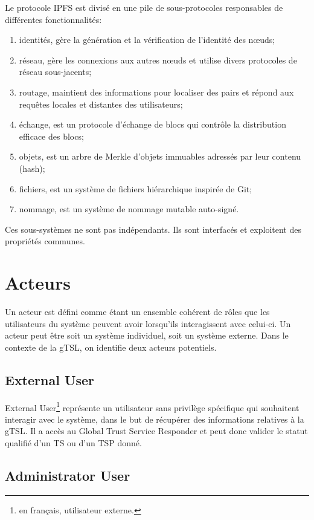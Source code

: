 \documentclass{tnreport}
\begin{document}
Le protocole IPFS est divisé en une pile de sous-protocoles responsables de différentes fonctionnalités:
\begin{enumerate}
	\item identités, gère la génération et la vérification de l'identité des nœuds;
	\item réseau, gère les connexions aux autres nœuds et utilise divers protocoles de réseau sous-jacents;
	\item routage, maintient des informations pour localiser des pairs et répond aux requêtes locales et distantes des utilisateurs;
	\item échange, est un protocole d'échange de blocs qui contrôle la distribution efficace des blocs;
	\item objets, est un arbre de Merkle d'objets immuables adressés par leur contenu (hash);
	\item fichiers, est un système de fichiers hiérarchique inspirée de Git;
	\item nommage, est un système de nommage mutable auto-signé.
\end{enumerate}
Ces sous-systèmes ne sont pas indépendants. Ils sont interfacés et exploitent des propriétés communes.

\section{Acteurs}

Un acteur est défini comme étant un ensemble cohérent de rôles que les utilisateurs du système peuvent avoir lorsqu'ils interagissent avec celui-ci. Un acteur peut être soit un système individuel, soit un système externe. Dans le contexte de la gTSL, on identifie deux acteurs potentiels.

\subsection{External User}

External User\footnote{en français, utilisateur externe.} représente un utilisateur sans privilège spécifique qui souhaitent interagir avec le système, dans le but de récupérer des informations relatives à la gTSL. Il a accès au Global Trust Service Responder et peut donc valider le statut qualifié d'un TS ou d'un TSP donné.

\subsection{Administrator User}
\end{document}
